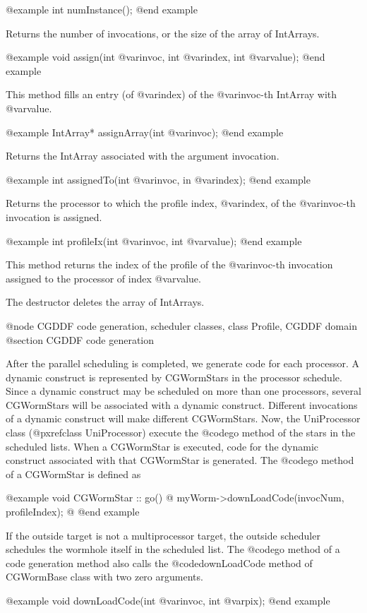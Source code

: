 {@example
int numInstance();
@end example

Returns the number of invocations, or the size of the array of IntArrays.

@example
void assign(int @var{invoc}, int @var{index}, int @var{value});
@end example

This method fills an entry (of @var{index}) of the @var{invoc}-th
IntArray with @var{value}.

@example
IntArray* assignArray(int @var{invoc});
@end example

Returns the IntArray associated with the argument invocation.

@example
int assignedTo(int @var{invoc}, in @var{index});
@end example

Returns the processor to which the profile index, @var{index}, of the
@var{invoc}-th invocation is assigned.

@example
int profileIx(int @var{invoc}, int @var{value});
@end example

This method returns the index of the profile of the @var{invoc}-th
invocation assigned to the processor of index @var{value}.

The destructor deletes the array of IntArrays.

@node CGDDF code generation, scheduler classes, class Profile, CGDDF domain
@section CGDDF code generation

After the parallel scheduling is completed, we generate code for each
processor. A dynamic construct is represented by CGWormStars in the
processor schedule. Since a dynamic construct may be scheduled on
more than one processors, several CGWormStars will be associated with
a dynamic construct. Different invocations of a dynamic construct
will make different CGWormStars. Now, the UniProcessor class
(@pxref{class UniProcessor}) execute the @code{go} method of the stars
in the scheduled lists. When a CGWormStar is executed, code for
the dynamic construct associated with that CGWormStar is generated.
The @code{go} method of a CGWormStar is defined as

@example
void CGWormStar :: go() @{
	myWorm->downLoadCode(invocNum, profileIndex);
@}
@end example

If the outside target is not a multiprocessor target, the outside
scheduler schedules the wormhole itself in the scheduled list. The @code{go}
method of a code generation method also calls the @code{downLoadCode}
method of CGWormBase class with two zero arguments.

@example
void downLoadCode(int @var{invoc}, int @var{pix});
@end example

}
